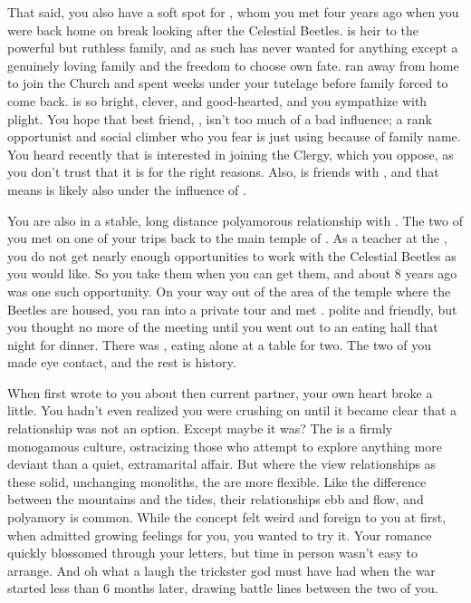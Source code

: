\documentclass[char]{GL2020}
\begin{document}
That said, you also have a soft spot for \cHeir{\full}, whom you met four years ago when you were back home on break looking after the Celestial Beetles. \cHeir{} is heir to the powerful but ruthless \cHeir{\formal} family, and as such has never wanted for anything except a genuinely loving family and the freedom to choose \cHeir{\their} own fate. \cHeir{\They} ran away from home to join the Church and spent weeks under your tutelage before \cHeir{\their} family forced \cHeir{\them} to come back. \cHeir{} is so bright, clever, and good-hearted, and you sympathize with \cHeir{\their} plight. You hope that \cHeir{\their} best friend, \cAmbition{\full}, isn't too much of a bad influence; \cAmbition{\they \are} a rank opportunist and social climber who you fear is just using \cHeir{} because of \cHeir{\their} family name. You heard recently that \cAmbition{} is interested in joining the Clergy, which you oppose, as you don't trust that it is for the right reasons. Also, \cAmbition{} is friends with \cScholarship{}, and that means \cAmbition{} is likely also under the influence of \cAntiChup{}.

You are also in a stable, long distance polyamorous relationship with \cJuniorStatesman{\full}. The two of you met on one of your trips back to the main temple of \cTechGod{}. As a teacher at the \pSchool{}, you do not get nearly enough opportunities to work with the Celestial Beetles as you would like. So you take them when you can get them, and about 8 years ago was one such opportunity. On your way out of the area of the temple where the Beetles are housed, you ran into a private tour and met \cJuniorStatesman{}. \cJuniorStatesman{\They} \cJuniorStatesman{\were} polite and friendly, but you thought no more of the meeting until you went out to an eating hall that night for dinner. There was \cJuniorStatesman{}, eating alone at a table for two. The two of you made eye contact, and the rest is history. 

When \cJuniorStatesman{} first wrote to you about \cJuniorStatesman{\their} then current partner, your own heart broke a little. You hadn’t even realized you were crushing on \cJuniorStatesman{\them} until it became clear that a relationship was not an option. Except maybe it was? The \pTech{} is a firmly monogamous culture, ostracizing those who attempt to explore anything more deviant than a quiet, extramarital affair. But where the \pTech{} view relationships as these solid, unchanging monoliths, the \pShippies{} are more flexible. Like the difference between the mountains and the tides, their relationships ebb and flow, and polyamory is common. While the concept felt weird and foreign to you at first, when \cJuniorStatesman{} admitted \cJuniorStatesman{\their} growing feelings for you, you wanted to try it. Your romance quickly blossomed through your letters, but time in person wasn’t easy to arrange. And oh what a laugh the trickster god must have had when the war started less than 6 months later, drawing battle lines between the two of you. 
\end{document}
